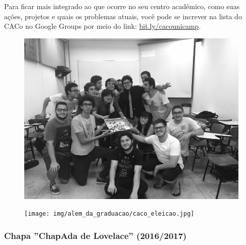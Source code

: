 Para ficar mais integrado ao que ocorre no seu centro acadêmico, como suas
ações, projetos e quais os problemas atuais, você pode se increver na lista do
CACo no Google Groups por meio do link:
\url{bit.ly/cacounicamp}.

\begin{figure}[H]
    \centering
    \includegraphics[width=.45\textwidth]{img/alem_da_graduacao/caco_chapa.jpg}
\end{figure}

\begin{figure}[H]
    \centering
    \texttt{[image: img/alem\_da\_graduacao/caco\_eleicao.jpg]}
\end{figure}

\subsubsection{Chapa ''ChapAda de Lovelace'' (2016/2017)}

